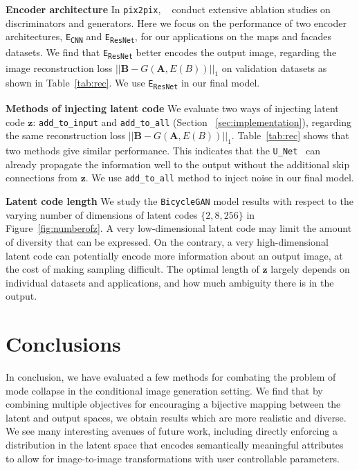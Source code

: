 {\bf Encoder architecture} In \texttt{pix2pix}, ~\citet{isola2016image} conduct extensive ablation studies on discriminators and generators. Here we focus on the performance of two encoder architectures, \texttt{E\textsubscript{CNN}} and \texttt{E\textsubscript{ResNet}}, for our applications on the maps and facades datasets. We find that \texttt{E\textsubscript{ResNet}} better encodes the output image, regarding the image reconstruction loss $||\mathbf{B} - G(\mathbf{A},E(B)) ||_1$ on validation datasets as shown in Table~\ref{tab:rec}. We use \texttt{E\textsubscript{ResNet}} in our final model.

{\bf Methods of injecting latent code} We evaluate two ways of injecting latent code $\mathbf{z}$: \texttt{add\_to\_input} and \texttt{add\_to\_all} (Section ~\ref{sec:implementation}), regarding the same reconstruction loss $||\mathbf{B} - G(\mathbf{A},E(B)) ||_1$. Table~\ref{tab:rec} shows that two methods give similar performance. This indicates that the \texttt{U\_Net}~\cite{ronneberger2015u} can already propagate the information well to the output without the additional skip connections from $\mathbf{z}$. We use \texttt{add\_to\_all} method to inject noise in our final model.

{\bf Latent code length} We study the \texttt{BicycleGAN} model results with respect to the varying number of dimensions of latent codes $\{2, 8, 256\}$ in Figure~\ref{fig:numberofz}. A very low-dimensional latent code may limit the amount of diversity that can be expressed. On the contrary, a very high-dimensional latent code can potentially encode more information about an output image, at the cost of making sampling difficult. The optimal length of $\mathbf{z}$ largely depends on individual datasets and applications, and how much ambiguity there is in the output. 

\section{Conclusions}
\label{sec:conclusion}

In conclusion, we have evaluated a few methods for combating the problem of mode collapse in the conditional image generation setting. We find that by combining multiple objectives for encouraging a bijective mapping between the latent and output spaces, we obtain results which are more realistic and diverse. We see many interesting avenues of future work, including directly enforcing a distribution in the latent space that encodes semantically meaningful attributes to allow for image-to-image transformations with user controllable parameters.

